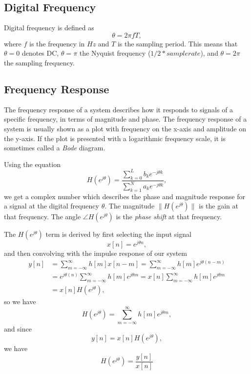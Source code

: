 \documentclass{article}
\def\lsqb{\left[}
\def\rsqb{\right]}
\def\sqb#1{\lsqb #1 \rsqb}
\def\xsig{x\sqb{n}}
\def\ysig{y\sqb{n}}
\begin{document}
\subsection{Digital Frequency}
Digital frequency is defined as
\begin{equation}
    \theta = 2\pi f T,
\end{equation}
where $f$ is the frequency in $Hz$ and $T$ is the sampling period. This means that $\theta=0$ denotes DC, $\theta=\pi$ the Nyquist frequency ($1/2 * samplerate$), and $\theta=2\pi$ the sampling frequency.

\subsection{Frequency Response}
The frequency response of a system describes how it responds to signals of a specific frequency, in terms of magnitude and phase. The frequency response of a system is usually shown as a plot with frequency on the x-axis and amplitude on the y-axis. If the plot is presented with a logarithmic frequency scale, it is sometimes called a \textit{Bode} diagram.

Using the equation
\def\hfun{H(e^{j\theta})}
\begin{equation}
    \hfun = \frac{\sum_{k=0}^{L} b_k e^{-j\theta k}}{\sum_{k=1}^{N} a_k e^{-j\theta k}},
\end{equation}
we get a complex number which describes the phase and magnitude response for a signal at the digital frequency $\theta$. The magnitude $\|\hfun\|$ is the gain at that frequency. The angle $\angle \hfun$ is the \textit{phase shift} at that frequency.

The $\hfun$ term is derived by first selecting the input signal
\begin{equation}
    \xsig = e^{j\theta n},
\end{equation}
and then convolving with the impulse response of our system
\def\convsum{\sum_{m=-\infty}^{\infty}}
\begin{align}
    \ysig &= \convsum h\sqb{m} x\sqb{n-m} = \convsum h\sqb{m} e^{j\theta(n-m)} \\
          &= e^{j\theta(n)} \convsum h\sqb{m} e^{j\theta m} = \xsig \convsum h\sqb{m} e^{j\theta m} \\
          &= \xsig \hfun,
\end{align}
so we have
\begin{equation}
    \hfun = \convsum h\sqb{m} e^{j\theta m},
\end{equation}
and since
\begin{equation}
    \ysig = \xsig \hfun,
\end{equation}
we have
\begin{equation}
    \hfun = \frac{\ysig}{\xsig}
\end{equation}
\end{document}
